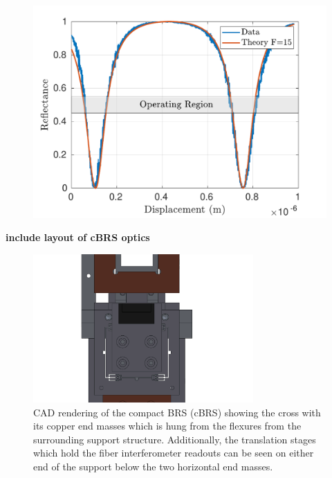 \documentclass [12pt, proquest]{uwthesis}[2019]
\begin{document}
\begin{figure}%
\begin{center}
 \includegraphics[width=\textwidth]{cBRS_Fringes.pdf}
\caption{}
\label{cBRS_fringes}
\end{center}
\end{figure}

\textbf{include layout of cBRS optics}

\begin{figure}[!h]
\begin{center}
\includegraphics[width=0.75\textwidth]{cBRSOptics.png}
\end{center}
\caption{CAD rendering of the compact BRS (cBRS) showing the cross with its copper end masses which is hung from the flexures from the surrounding support structure. Additionally, the translation stages which hold the fiber interferometer readouts can be seen on either end of the support below the two horizontal end masses.}
\end{figure}
\end{document}

